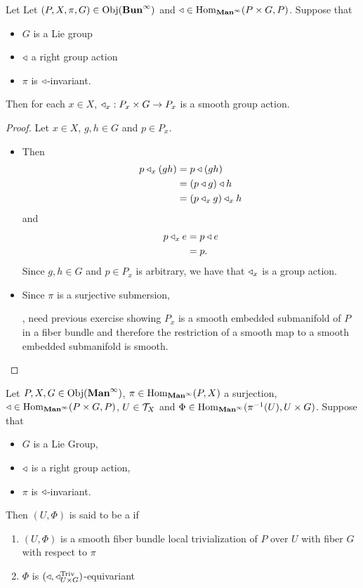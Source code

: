\documentclass{book}
\begin{document}
\begin{ex}
	Let Let $(P, X, \pi, G) \in \operatorname{Obj}(\operatorname*{\text{\textbf{Bun}}^{\infty}})$ and $\triangleleft \in \operatorname{Hom}_{\operatorname*{\text{\textbf{Man}}^{\infty}}}(P \times G, P)$. Suppose that \begin{itemize}
		\item $G$ is a Lie group 
		\item $\triangleleft$ a right group action
		\item $\pi$ is $\triangleleft$-invariant.
	\end{itemize}  
	Then for each $x \in X$, $\triangleleft_x : P_x \times G \rightarrow P_x$ is a smooth group action.
\end{ex}

\begin{proof}
	Let $x \in X$, $g,h \in G$ and $p \in P_x$.
	\begin{itemize}
		\item Then
		\begin{align*}
			p \triangleleft_x (g h)
			& = p \triangleleft (gh) \\
			& = (p \triangleleft g) \triangleleft h \\
			& = (p \triangleleft_x g) \triangleleft_x h
		\end{align*}
		and 
		\begin{align*}
			p \triangleleft_x e
			& = p \triangleleft e \\
			& = p.
		\end{align*}
		Since $g,h \in G$ and $p \in P_x$ is arbitrary, we have that $\triangleleft_x $ is a group action.
		\item Since $\pi$ is a surjective submersion,
		
		, need previous exercise showing $P_x$ is a smooth embedded submanifold of $P$ in a fiber bundle and therefore the restriction of a smooth map to a smooth embedded submanifold is smooth.
	\end{itemize} 
\end{proof}

\begin{defn}
	Let $P, X, G \in \operatorname{Obj}(\operatorname*{\text{\textbf{Man}}^{\infty}})$, $\pi \in \operatorname{Hom}_{\operatorname*{\text{\textbf{Man}}^{\infty}}}(P, X)$ a surjection, $\triangleleft \in \operatorname{Hom}_{\operatorname*{\text{\textbf{Man}}^{\infty}}}(P \times G , P)$, $U \in \mathcal{T}_X$ and $\Phi \in \operatorname{Hom}_{\operatorname*{\text{\textbf{Man}}^{\infty}}}(\pi^{-1}(U), U \times G)$. Suppose that  
	\begin{itemize}
		\item $G$ is a Lie Group, 
		\item $\triangleleft$ is a right group action,
		\item $\pi$ is $\triangleleft$-invariant.
	\end{itemize}
	Then $(U, \Phi)$ is said to be a  if 
	\begin{enumerate}
		\item $(U, \Phi)$ is a smooth fiber bundle local trivialization of $P$ over $U$ with fiber $G$ with respect to $\pi$
		\item $\Phi$ is $(\triangleleft, \triangleleft^{\text{Triv}}_{U \times G})$-equivariant
	\end{enumerate}
\end{defn}
\end{document}
